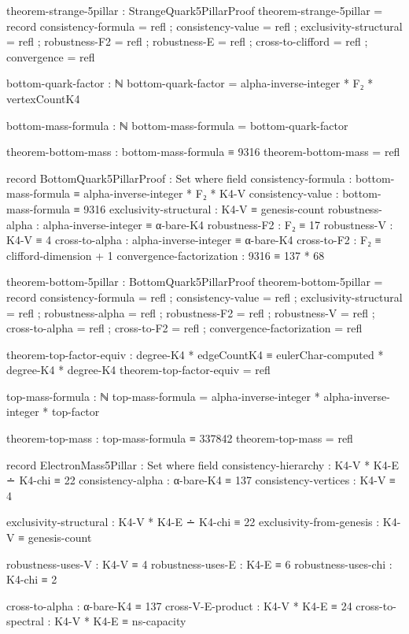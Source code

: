 \documentclass[11pt,a4paper]{book}
\begin{document}
\begin{code}
theorem-strange-5pillar : StrangeQuark5PillarProof
theorem-strange-5pillar = record
  { consistency-formula = refl
  ; consistency-value = refl
  ; exclusivity-structural = refl
  ; robustness-F2 = refl
  ; robustness-E = refl
  ; cross-to-clifford = refl
  ; convergence = refl
  }

bottom-quark-factor : ℕ
bottom-quark-factor = alpha-inverse-integer * F₂ * vertexCountK4

bottom-mass-formula : ℕ
bottom-mass-formula = bottom-quark-factor

theorem-bottom-mass : bottom-mass-formula ≡ 9316
theorem-bottom-mass = refl

record BottomQuark5PillarProof : Set where
  field
    consistency-formula : bottom-mass-formula ≡ alpha-inverse-integer * F₂ * K4-V
    consistency-value : bottom-mass-formula ≡ 9316
    exclusivity-structural : K4-V ≡ genesis-count
    robustness-alpha : alpha-inverse-integer ≡ α-bare-K4
    robustness-F2 : F₂ ≡ 17
    robustness-V : K4-V ≡ 4
    cross-to-alpha : alpha-inverse-integer ≡ α-bare-K4
    cross-to-F2 : F₂ ≡ clifford-dimension + 1
    convergence-factorization : 9316 ≡ 137 * 68
    
theorem-bottom-5pillar : BottomQuark5PillarProof
theorem-bottom-5pillar = record
  { consistency-formula = refl
  ; consistency-value = refl
  ; exclusivity-structural = refl
  ; robustness-alpha = refl
  ; robustness-F2 = refl
  ; robustness-V = refl
  ; cross-to-alpha = refl
  ; cross-to-F2 = refl
  ; convergence-factorization = refl
  }

theorem-top-factor-equiv : degree-K4 * edgeCountK4 ≡ eulerChar-computed * degree-K4 * degree-K4
theorem-top-factor-equiv = refl

top-mass-formula : ℕ
top-mass-formula = alpha-inverse-integer * alpha-inverse-integer * top-factor

theorem-top-mass : top-mass-formula ≡ 337842
theorem-top-mass = refl

record ElectronMass5Pillar : Set where
  field
    consistency-hierarchy : K4-V * K4-E ∸ K4-chi ≡ 22
    consistency-alpha : α-bare-K4 ≡ 137
    consistency-vertices : K4-V ≡ 4
    
    exclusivity-structural : K4-V * K4-E ∸ K4-chi ≡ 22
    exclusivity-from-genesis : K4-V ≡ genesis-count
    
    robustness-uses-V : K4-V ≡ 4
    robustness-uses-E : K4-E ≡ 6
    robustness-uses-chi : K4-chi ≡ 2
    
    cross-to-alpha : α-bare-K4 ≡ 137
    cross-V-E-product : K4-V * K4-E ≡ 24
    cross-to-spectral : K4-V * K4-E ≡ ns-capacity
    

\end{code}
\end{document}
